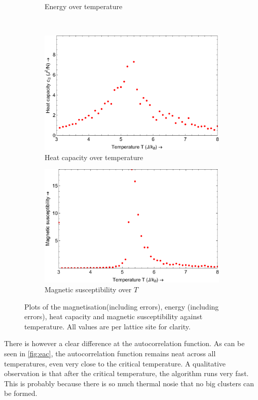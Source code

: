 \documentclass[a4paper]{article}
\begin{document}
\begin{figure}[H]
\begin{subfigure}[b]{0.4\textwidth}
		\caption{Energy over temperature}
	\end{subfigure}%
	\\
	\begin{subfigure}[b]{0.4\textwidth}   
		\centering
		\includegraphics[width=\textwidth]{hcplotW.pdf}
		\caption{Heat capacity over temperature}
	\end{subfigure}%
	\begin{subfigure}[b]{0.4\textwidth}
		\centering
		\includegraphics[width=\textwidth]{magsusplotW.pdf}
		\caption{Magnetic susceptibility over $T$}
	\end{subfigure}
	\caption{Plots of the magnetisation(including errors), energy (including errors), heat capacity and magnetic susceptibility against temperature. All values are per lattice site for clarity.}
	\label{fig:wolff}
\end{figure}

There is however a clear difference at the autocorrelation function. As can be seen in \autoref{fig:eac}, the autocorrelation function remains neat across all temperatures, even very close to the critical temperature. A qualitative observation is that after the critical temperature, the algorithm runs very fast. This is probably because there is so much thermal nosie that no big clusters can be formed.
\end{document}
